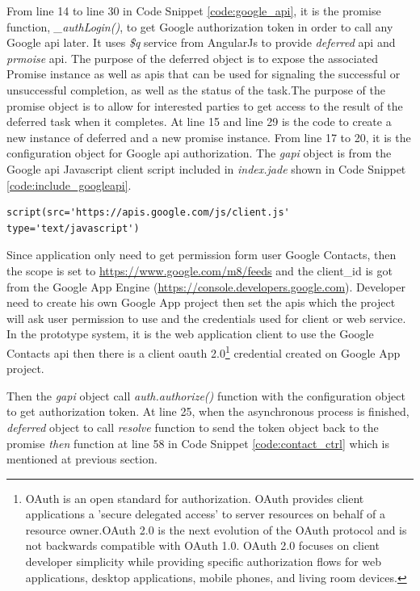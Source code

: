 \par From line 14 to line 30 in Code Snippet \ref{code:google_api}, it is the promise function, \textit{\_authLogin()}, to get Google authorization token in order to call any Google \gls{api} later. It uses \textit{\$q} service from AngularJs to provide \textit{deferred} \gls{api} and \textit{prmoise} \gls{api}. The purpose of the deferred object is to expose the associated Promise instance as well as \gls{api}s that can be used for signaling the successful or unsuccessful completion, as well as the status of the task.The purpose of the promise object is to allow for interested parties to get access to the result of the deferred task when it completes.\cite{angular:q} At line 15 and line 29 is the code to create a new instance of deferred and a new promise instance. From line 17 to 20, it is the configuration object for Google \gls{api} authorization. The \textit{gapi} object is from the Google \gls{api} Javascript client script included in \textit{index.jade} shown in Code Snippet \ref{code:include_googleapi}.

\begin{lstlisting}[caption={Include Google API Javascript file in Index.iade},label={code:include_googleapi}]
script(src='https://apis.google.com/js/client.js' type='text/javascript')
\end{lstlisting}

\par Since application only need to get permission form user Google Contacts, then the scope is set to \url{https://www.google.com/m8/feeds} and the client\_id is got from the Google App Engine (\url{https://console.developers.google.com}). Developer need to create his own Google App project then set the \gls{api}s which the project will ask user permission to use and the credentials used for client or web service. In the prototype system, it is the web application client to use the Google Contacts \gls{api} then there is a client \gls{oauth} 2.0\footnote{OAuth is an open standard for authorization. OAuth provides client applications a 'secure delegated access' to server resources on behalf of a resource owner.OAuth 2.0 is the next evolution of the OAuth protocol and is not backwards compatible with OAuth 1.0. OAuth 2.0 focuses on client developer simplicity while providing specific authorization flows for web applications, desktop applications, mobile phones, and living room devices.\cite{wiki:oauth}} credential created on Google App project.

\par Then the \textit{gapi} object call \textit{auth.authorize()} function with the configuration object to get authorization token. At line 25, when the asynchronous process is finished, \textit{deferred} object to call \textit{resolve} function to send the token object back to the promise \textit{then} function at line 58 in Code Snippet \ref{code:contact_ctrl} which is mentioned at previous section.

